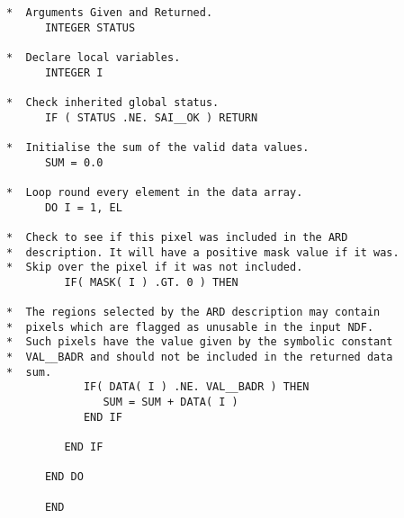 \begin{enumerate}
\begin{verbatim}
*  Arguments Given and Returned.                              
      INTEGER STATUS                                          
                                                              
*  Declare local variables.                                   
      INTEGER I                                               
                                                              
*  Check inherited global status.                             
      IF ( STATUS .NE. SAI__OK ) RETURN                       
                                                              
*  Initialise the sum of the valid data values.               
      SUM = 0.0                                               
                                                              
*  Loop round every element in the data array.                
      DO I = 1, EL                                            
                                                              
*  Check to see if this pixel was included in the ARD         
*  description. It will have a positive mask value if it was. 
*  Skip over the pixel if it was not included.                
         IF( MASK( I ) .GT. 0 ) THEN                          
                                                              
*  The regions selected by the ARD description may contain    
*  pixels which are flagged as unusable in the input NDF.     
*  Such pixels have the value given by the symbolic constant  
*  VAL__BADR and should not be included in the returned data  
*  sum.                                                       
            IF( DATA( I ) .NE. VAL__BADR ) THEN               
               SUM = SUM + DATA( I )                          
            END IF                                            
                                                              
         END IF                                               
                                                              
      END DO                                                  
                                                              
      END                                                     
\end{verbatim}
\normalsize


\end{enumerate}
